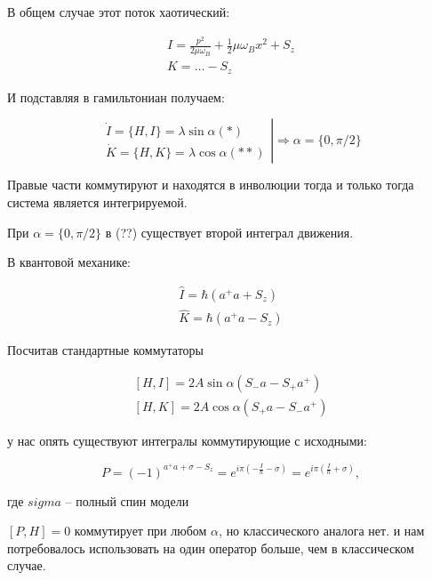 В общем случае этот поток хаотический:

\begin{equation}
    \begin{align}
        I = \frac{p^2}{2\mu\omega_B} + \frac{1}{2} \mu \omega_Bx^2 + S_z \\
        K = \ldots - S_z
    \end{align}
\end{equation}

И подставляя в гамильтониан получаем:

\begin{equation}
    \left.
    \begin{align}
        \dot I = \{H,I\} = \lambda\sin\alpha(*) \\
        \dot K = \{H,K\} = \lambda\cos\alpha(**)
    \end{align}
    \right| \Rightarrow \alpha = \{0,\pi/2\}
\end{equation}

Правые части коммутируют и находятся в инволюции тогда и только тогда система является
интегрируемой.

При $\alpha = \{ 0,\pi/2\}$ в (??) существует второй интеграл движения.

В квантовой механике:

\begin{equation}
    \begin{align}
        \hat I = \hbar (a^+a + S_z) \\
        \hat K = \hbar (a^+a - S_z)
    \end{align}
\end{equation}

Посчитав стандартные коммутаторы

\begin{equation}
    \begin{align}
        [H,I] = 2 A \sin\alpha(S_- a - S_+ a^+) \\
        [H,K] = 2 A \cos\alpha(S_+ a - S_- a^+)
    \end{align}
\end{equation}

у нас опять существуют интегралы коммутирующие с исходными:

$$ P =(-1)^{a^+a+\sigma-S_z} = e^{i\pi(-\frac{I}{\hbar}-\sigma)}
= e^{i\pi(\frac{I}{\hbar}+\sigma)},$$

где $sigma$ -- полный спин модели

$[P,H] = 0$ коммутирует при любом $\alpha$, но классического аналога нет.
и нам потребовалось использовать на один оператор больше, чем в классическом случае.

